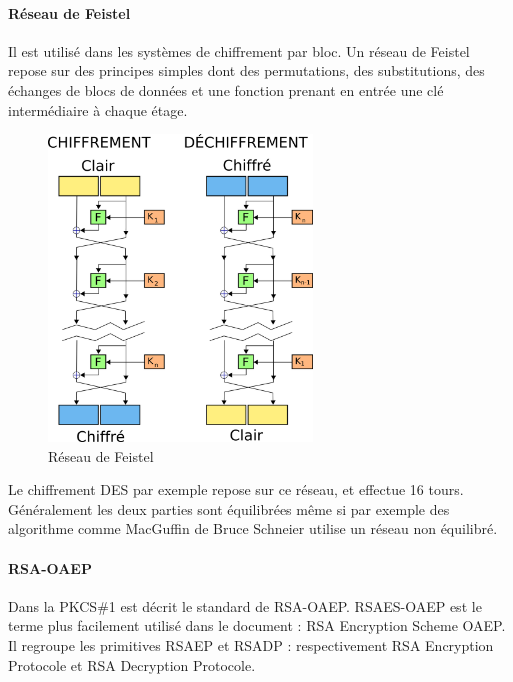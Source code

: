 \paragraph{Réseau de Feistel}
Il est utilisé dans les systèmes de chiffrement par bloc. Un réseau de Feistel repose sur des principes simples dont des permutations, des substitutions, des échanges de blocs de données et une fonction prenant en entrée une clé intermédiaire à chaque étage.\\
\begin{figure}[H]
\centering
\includegraphics[width=7cm]{images/Reseau_de_feistel.png}
\caption{Réseau de Feistel}
\label{Feistel}
\end{figure}

Le chiffrement DES par exemple repose sur ce réseau, et effectue 16 tours.\\
Généralement les deux parties sont équilibrées même si par exemple des algorithme comme MacGuffin de Bruce Schneier utilise un réseau non équilibré.

\paragraph{RSA-OAEP}
Dans la PKCS\#1 est décrit le standard de RSA-OAEP. RSAES-OAEP est le terme plus facilement utilisé dans le document : RSA Encryption Scheme OAEP.\\
Il regroupe les primitives RSAEP et RSADP : respectivement RSA Encryption Protocole et RSA Decryption Protocole.

